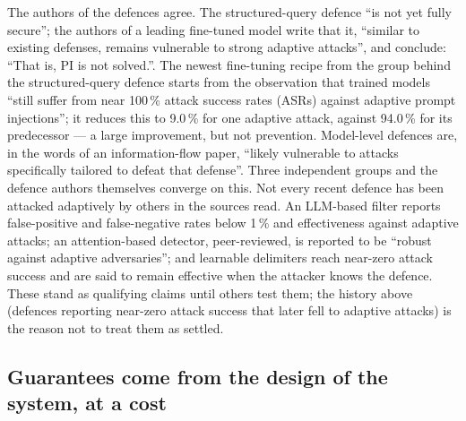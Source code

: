 The authors of the defences agree. The structured-query defence
\enquote{is not yet fully secure}\autocite{Chen2025StruQ}; the authors of
a leading fine-tuned model write that it, \enquote{similar to existing
defenses, remains vulnerable to strong adaptive attacks}, and conclude:
\enquote{That is, PI is not solved.}\autocite{Chen2025MetaSecAlign}.
The newest fine-tuning recipe from the group behind the structured-query
defence starts from the observation that trained models \enquote{still
suffer from near 100\,\% attack success rates (ASRs) against adaptive
prompt injections}; it reduces this to 9.0\,\% for one adaptive attack,
against 94.0\,\% for its predecessor\autocite{Peng2026SecOPD} --- a large
improvement, but not prevention.
Model-level defences are, in the words of an information-flow paper,
\enquote{likely vulnerable to attacks specifically tailored to defeat
that defense}\autocite{Wu2024IFC}. Three independent groups and the
defence authors themselves converge on this. Not every recent defence
has been attacked adaptively by others in the sources read. An LLM-based
filter reports false-positive and false-negative rates below 1\,\% and
effectiveness against adaptive attacks\autocite{Shi2025PromptArmor}; an
attention-based detector, peer-reviewed, is reported to be \enquote{robust
against adaptive adversaries}\autocite{Zhong2026Rennervate}; and learnable
delimiters reach near-zero attack success and are said to remain effective
when the attacker knows the defence\autocite{Zhao2026LTBD}. These stand as
qualifying claims until others test them; the history above (defences
reporting near-zero attack success that later fell to adaptive attacks) is
the reason not to treat them as settled.

\subsection{Guarantees come from the design of the system, at a cost}


